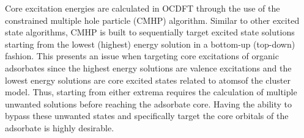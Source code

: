 \documentclass{article}
\begin{document}
	
Core excitation energies are calculated in OCDFT through the use of the constrained multiple hole particle (CMHP) algorithm. Similar to other excited state algorithms, CMHP is built to sequentially target excited state solutions starting from the lowest (highest) energy solution in a bottom-up (top-down) fashion. This presents an issue when targeting core excitations of organic adsorbates since the highest energy solutions are valence excitations and the lowest energy solutions are core excited states related to atomsof the cluster model. Thus, starting from either extrema requires the calculation of multiple unwanted solutions before reaching the adsorbate core. Having the ability to bypass these unwanted states and specifically target the core orbitals of the adsorbate is highly desirable.
\end{document}
